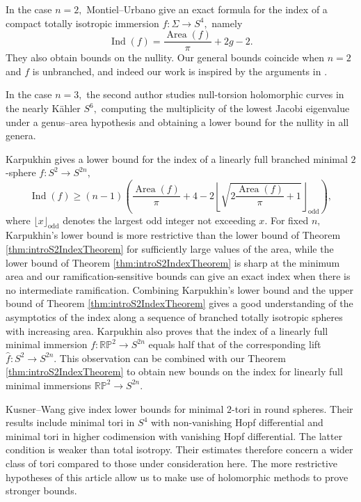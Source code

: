 \documentclass[11pt]{article}
\theoremstyle{definition}
\numberwithin{equation}{section}
\begin{document}
In the case $n=2,$ Montiel--Urbano \cite{MontUrb97} give an exact formula for the index of a compact totally isotropic immersion $f: \Sigma \to S^4,$ namely
\begin{equation*}
    \operatorname{Ind} (f) = \frac{\operatorname{Area}(f)}{\pi} + 2g-2.
\end{equation*}
They also obtain bounds on the nullity. Our general bounds coincide when $n=2$ and $f$ is unbranched, and indeed our work is inspired by the arguments in \cite{MontUrb97}.

In the case $n=3,$ the second author \cite{Madnick22} studies null-torsion holomorphic curves in the nearly K\"ahler $S^6,$ computing the multiplicity of the lowest Jacobi eigenvalue under a genus--area hypothesis and obtaining a lower bound for the nullity in all genera.

Karpukhin \cite{Karpukhin21} gives a lower bound for the index of a linearly full branched minimal $2$-sphere $f: S^2 \to S^{2n},$
\begin{equation*}
    \operatorname{Ind}(f) \geq (n-1)\left( \frac{\operatorname{Area}(f)}{\pi} + 4 - 2 \left\lfloor \sqrt{2\frac{\operatorname{Area}(f)}{\pi} + 1} \right\rfloor_{\mathrm{odd}}  \right),
\end{equation*}
where $\lfloor x \rfloor_{\mathrm{odd}}$ denotes the largest odd integer not exceeding $x.$ For fixed $n,$ Karpukhin's lower bound is more restrictive than the lower bound of Theorem \ref{thm:introS2IndexTheorem} for sufficiently large values of the area, while the lower bound of Theorem \ref{thm:introS2IndexTheorem} is sharp at the minimum area and our ramification-sensitive bounds can give an exact index when there is no intermediate ramification. Combining Karpukhin's lower bound and the upper bound of Theorem \ref{thm:introS2IndexTheorem} gives a good understanding of the asymptotics of the index along a sequence of branched totally isotropic spheres with increasing area. Karpukhin also proves that the index of a linearly full minimal immersion $f: \mathbb{RP}^2 \to S^{2n}$ equals half that of the corresponding lift $\widehat{f} : S^2 \to S^{2n}.$ This observation can be combined with our Theorem \ref{thm:introS2IndexTheorem} to obtain new bounds on the index for linearly full minimal immersions $\mathbb{RP}^2 \to S^{2n}.$

Kusner--Wang \cite{KusWang24} give index lower bounds for minimal $2$-tori in round spheres. Their results include minimal tori in $S^4$ with non-vanishing Hopf differential and minimal tori in higher codimension with vanishing Hopf differential. The latter condition is weaker than total isotropy. Their estimates therefore concern a wider class of tori compared to those under consideration here. The more restrictive hypotheses of this article allow us to make use of holomorphic methods to prove stronger bounds. 
\end{document}
